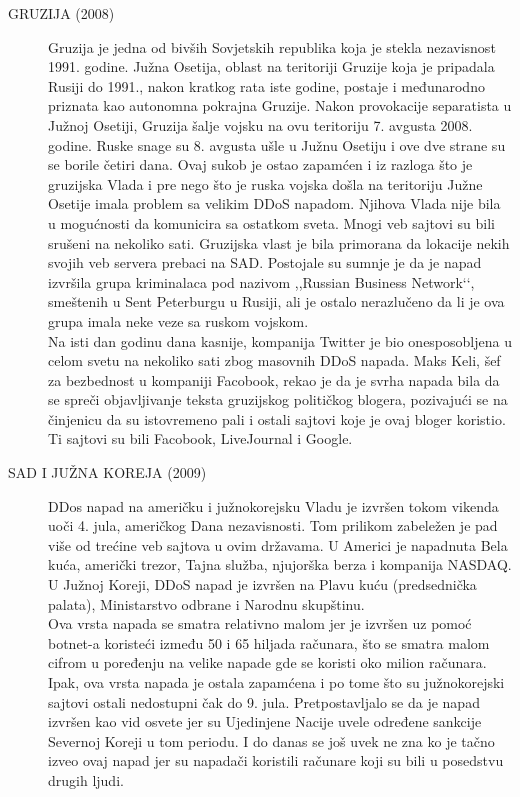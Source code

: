 \documentclass[a4paper]{article}
\theoremstyle{break}
\begin{document}
{\begin{description}
\item [GRUZIJA (2008)] Gruzija je jedna od bivših Sovjetskih republika koja je stekla nezavisnost 1991. godine. Južna Osetija, oblast na teritoriji Gruzije koja je pripadala Rusiji do 1991., nakon kratkog rata iste godine, postaje i međunarodno priznata kao autonomna pokrajna Gruzije. Nakon provokacije separatista u Južnoj Osetiji, Gruzija šalje vojsku na ovu teritoriju 7. avgusta 2008. godine. Ruske snage su 8. avgusta ušle u Južnu Osetiju i ove dve strane su se borile četiri dana. Ovaj sukob je ostao zapamćen i iz razloga što je gruzijska Vlada i pre nego što je ruska vojska došla na teritoriju Južne Osetije imala problem sa velikim DDoS napadom. Njihova Vlada nije bila u mogućnosti da komunicira sa ostatkom sveta. Mnogi veb sajtovi su bili srušeni na nekoliko sati. Gruzijska vlast je bila primorana da lokacije nekih svojih veb servera prebaci na SAD. Postojale su sumnje je da je napad izvršila grupa kriminalaca pod nazivom ,,Russian Business Network‘‘, smeštenih u Sent Peterburgu u Rusiji, ali je ostalo nerazlučeno da li je ova grupa imala neke veze sa ruskom vojskom.
\\Na isti dan godinu dana kasnije, kompanija Twitter je bio onesposobljena u celom svetu na nekoliko sati zbog masovnih DDoS napada. Maks Keli, šef za bezbednost u kompaniji Facobook, rekao je da je svrha napada bila da se spreči objavljivanje teksta gruzijskog političkog blogera, pozivajući se na činjenicu da su istovremeno pali i ostali sajtovi koje je ovaj bloger koristio. Ti sajtovi su bili Facobook, LiveJournal i Google.     
\item [SAD I JUŽNA KOREJA (2009)] DDos napad na američku i \linebreak južnokorejsku Vladu je izvršen tokom vikenda uoči 4. jula, američkog Dana nezavisnosti. Tom prilikom zabeležen je pad više od trećine veb sajtova u ovim državama. U Americi je napadnuta Bela kuća, američki trezor, Tajna služba, njujorška berza i kompanija NASDAQ. U Južnoj Koreji, DDoS napad je izvršen na Plavu kuću (predsednička palata), Ministarstvo odbrane i Narodnu skupštinu.
\\Ova vrsta napada se smatra relativno malom jer je izvršen uz pomoć botnet-a koristeći između 50 i 65 hiljada računara, što se smatra malom cifrom u poređenju na velike napade gde se koristi oko milion računara. Ipak, ova vrsta napada je ostala zapamćena i po tome što su južnokorejski sajtovi ostali nedostupni čak do 9. jula. Pretpostavljalo se da je napad izvršen kao vid osvete jer su Ujedinjene Nacije uvele određene sankcije Severnoj Koreji u tom periodu. I do danas se još uvek ne zna ko je tačno izveo ovaj napad jer su napadači koristili računare koji su bili u posedstvu drugih ljudi.    


\end{description}}
\end{document}

